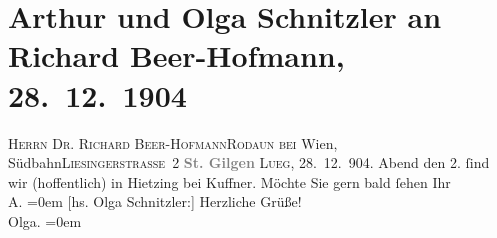 

         
         \renewcommand{\erwaehntePersonen}{Personen: Richard Beer-Hofmann}
         \renewcommand{\erwaehnteInstitutionen}{Institutionen: Südbahnstrecke}
         \renewcommand{\erwaehnteOrte}{Orte: Liesingerstraße, Ottakringer Bräu, Rodaun, St. Gilgen, Wien, XIII., Hietzing}
         \renewcommand{\erwaehnteWerke}{}
               \section[Arthur und Olga Schnitzler an Richard Beer-Hofmann, 28. 12. 1904]{ Arthur und Olga Schnitzler an Richard Beer-Hofmann,
               28. 12. 1904}\nopagebreak{}\rehead{ }\begin{ledgroupsized}[t]{13cm}\normalsize\beginnumbering \toendnotes[C]{\smallbreak\pagebreak[2]} 
\toendnotes[C]{\smallbreak}\pstart{}{\pb}\textsc{Herrn Dr. Richard Beer-Hofmann}\pend{}\pstart{}\textsc{Rodaun}{ }\introOben{}\textsc{bei}{ }Wien, Südbahn\introOben{}\pend{}\pstart{}\textsc{Liesingerstraße 2}\pend{}{\bigskip}\pstart
           \noindent{}\centering{}\textcolor{gray}{\textbf{{\pb}St. Gilgen}}\pend
           \pstart
           \textsc{Lueg}, 28. 12. 904.\pend
           \pstart
           \label{K_L01484_1v}\label{K_L01484_1h}{ }Abend den 2. ſind wir (hoffentlich) in Hietzing bei Kuffner. Möchte
               Sie gern bald ſehen\pend
           \pstart
           Ihr{\\[\baselineskip]}\spacefill\mbox{A.}\pend
           \leftskip=0em{}\pstart
           {[}hs. Olga Schnitzler:{]} Herzliche Grüße! {\\[\baselineskip]}\spacefill\mbox{Olga.}\pend
           \leftskip=0em{}
         
         \endnumbering{}\end{ledgroupsized}  \newcommand{\dateiname}{L01484}\newcommand{\titel}{Arthur und Olga Schnitzler an Richard Beer-Hofmann, 28. 12. 1904}\newcommand{\editorInnen}{Martin Anton Müller und Gerd-Hermann Susen}
      